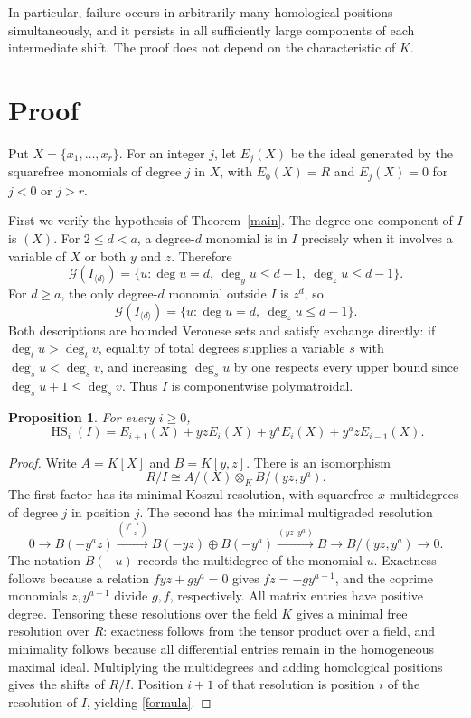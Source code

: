 \documentclass[11pt]{article}
\newtheorem{proposition}[theorem]{Proposition}
\theoremstyle{remark}\newtheorem{remark}[theorem]{Remark}
\newcommand{\HS}{\operatorname{HS}}
\newcommand{\G}{\mathcal G}
\begin{document}
In particular, failure occurs in arbitrarily many homological positions simultaneously, and it persists in all sufficiently large components of each intermediate shift. The proof does not depend on the characteristic of $K$.

\section{Proof}
Put $X=\{x_1,\ldots,x_r\}$. For an integer $j$, let $E_j(X)$ be the ideal generated by the squarefree monomials of degree $j$ in $X$, with $E_0(X)=R$ and $E_j(X)=0$ for $j<0$ or $j>r$.

First we verify the hypothesis of Theorem~\ref{main}. The degree-one component of $I$ is $(X)$. For $2\leq d<a$, a degree-$d$ monomial is in $I$ precisely when it involves a variable of $X$ or both $y$ and $z$. Therefore
\[
 \G(I_{\langle d\rangle})=
 \{u:\deg u=d,\ \deg_yu\leq d-1,\ \deg_zu\leq d-1\}.
\]
For $d\geq a$, the only degree-$d$ monomial outside $I$ is $z^d$, so
\[
 \G(I_{\langle d\rangle})=\{u:\deg u=d,\ \deg_zu\leq d-1\}.
\]
Both descriptions are bounded Veronese sets and satisfy exchange directly: if $\deg_tu>\deg_tv$, equality of total degrees supplies a variable $s$ with $\deg_su<\deg_sv$, and increasing $\deg_su$ by one respects every upper bound since $\deg_su+1\leq\deg_sv$. Thus $I$ is componentwise polymatroidal.

\begin{proposition}\label{shifts}
For every $i\geq0$,
\begin{equation}\label{formula}
 \HS_i(I)=E_{i+1}(X)+yzE_i(X)+y^aE_i(X)+y^azE_{i-1}(X).
\end{equation}
\end{proposition}
\begin{proof}
Write $A=K[X]$ and $B=K[y,z]$. There is an isomorphism
\[
 R/I\cong A/(X)\otimes_K B/(yz,y^a).
\]
The first factor has its minimal Koszul resolution, with squarefree $x$-multidegrees of degree $j$ in position $j$. The second has the minimal multigraded resolution
\[
 0\longrightarrow B(-y^az)
 \xrightarrow{\binom{y^{a-1}}{-z}}
 B(-yz)\oplus B(-y^a)
 \xrightarrow{(yz\ \ y^a)} B
 \longrightarrow B/(yz,y^a)\longrightarrow0.
\]
The notation $B(-u)$ records the multidegree of the monomial $u$. Exactness follows because a relation $fyz+gy^a=0$ gives $fz=-gy^{a-1}$, and the coprime monomials $z,y^{a-1}$ divide $g,f$, respectively. All matrix entries have positive degree. Tensoring these resolutions over the field $K$ gives a minimal free resolution over $R$: exactness follows from the tensor product over a field, and minimality follows because all differential entries remain in the homogeneous maximal ideal. Multiplying the multidegrees and adding homological positions gives the shifts of $R/I$. Position $i+1$ of that resolution is position $i$ of the resolution of $I$, yielding \eqref{formula}.
\end{proof}
\end{document}
